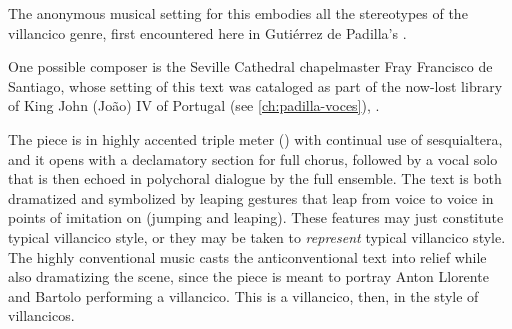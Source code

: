 The anonymous musical setting for this embodies all the stereotypes of the
villancico genre, first encountered here in Gutiérrez de Padilla's .%
\begin{Footnote}
    One possible composer is the Seville Cathedral chapelmaster Fray Francisco
    de Santiago, whose setting of this text was cataloged as part of the
    now-lost library of King John (João) IV of Portugal (see
    \cref{ch:padilla-voces}), 
    \autocite[caixão 26, ]{JohnIV:Catalog}.
\end{Footnote}
The piece is in highly accented triple meter (\meterCZ) with continual use of
sesquialtera, and it opens with a declamatory section for full chorus, followed
by a vocal solo that is then echoed in polychoral dialogue by the full
ensemble.
The text is both dramatized and symbolized by leaping gestures that leap from
voice to voice in points of imitation on  (jumping
and leaping).
These features may just constitute typical villancico style, or they may be
taken to \emph{represent} typical villancico style.
The highly conventional music casts the anticonventional text into relief while
also dramatizing the scene, since the piece is meant to portray Anton Llorente
and Bartolo performing a villancico.
This is a villancico, then, in the style of villancicos.




